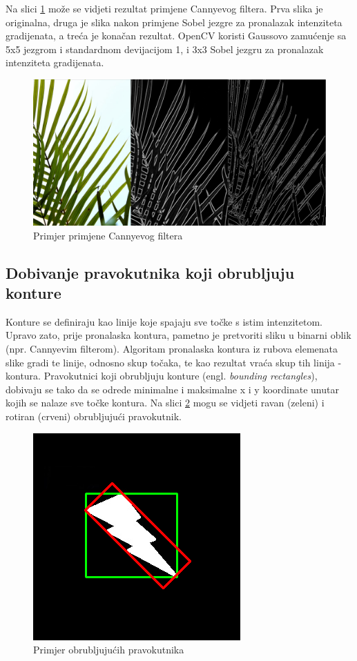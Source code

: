 \documentclass[times, utf8, zavrsni, numeric]{fer}
\begin{document}
Na slici \ref{fig:canny} može se vidjeti rezultat primjene Cannyevog filtera. Prva slika je originalna, druga je slika nakon primjene Sobel jezgre za pronalazak intenziteta gradijenata, a treća je konačan rezultat. OpenCV koristi Gaussovo zamućenje sa 5x5 jezgrom i standardnom devijacijom 1, i 3x3 Sobel jezgru za pronalazak intenziteta gradijenata\cite{canny2}.

\begin{figure}[h]
	\includegraphics[scale=0.22]{canny.jpeg}
	\centering
	\caption{Primjer primjene Cannyevog filtera\cite{canny2}}
	\label{fig:canny}
\end{figure}

\subsection{Dobivanje pravokutnika koji obrubljuju konture}
Konture se definiraju kao linije koje spajaju sve točke s istim intenzitetom. Upravo zato, prije pronalaska kontura, pametno je pretvoriti sliku u binarni oblik (npr. Cannyevim filterom). Algoritam pronalaska kontura iz rubova elemenata slike gradi te linije, odnosno skup točaka, te kao rezultat vraća skup tih linija - kontura. Pravokutnici koji obrubljuju konture (engl. \textit{bounding rectangles}), dobivaju se tako da se odrede minimalne i maksimalne x i y koordinate unutar kojih se nalaze sve točke kontura. Na slici \ref{fig:bounding} mogu se vidjeti ravan (zeleni) i rotiran (crveni) obrubljujući pravokutnik.

\begin{figure}[h]
	\includegraphics[scale=0.5]{bounding.png}
	\centering
	\caption{Primjer obrubljujućih pravokutnika\cite{bounding}}
	\label{fig:bounding}
\end{figure}
\end{document}
